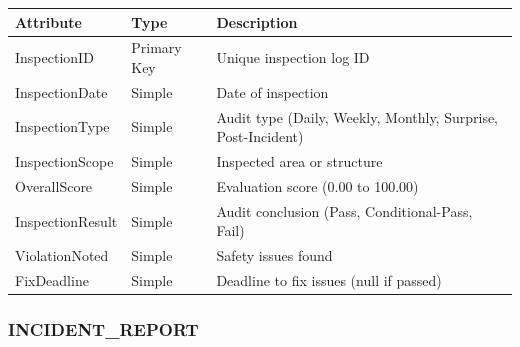 \documentclass[a4paper,12pt]{report}
\newcounter{none} %
\begin{document}
{\def\LTcaptype{none} %
\begin{longtable}[]{@{}
  >{\raggedright\arraybackslash}p{}
  >{\raggedright\arraybackslash}p{}
  >{\raggedright\arraybackslash}p{}@{}}
\toprule\noalign{}
\begin{minipage}[b]{\linewidth}\raggedright
Attribute
\end{minipage} & \begin{minipage}[b]{\linewidth}\raggedright
Type
\end{minipage} & \begin{minipage}[b]{\linewidth}\raggedright
Description
\end{minipage} \\
\midrule\noalign{}
\endhead
\bottomrule\noalign{}
\endlastfoot
InspectionID & Primary Key & Unique inspection log ID \\
InspectionDate & Simple & Date of inspection \\
InspectionType & Simple & Audit type (\allowbreak{}Daily, Weekly, Monthly, Surprise, Post-Incident) \\
InspectionScope & Simple & Inspected area or structure \\
OverallScore & Simple & Evaluation score (\allowbreak{}0.00 to 100.00) \\
InspectionResult & Simple & Audit conclusion (\allowbreak{}Pass, Conditional-Pass, Fail) \\
ViolationNoted & Simple & Safety issues found \\
FixDeadline & Simple & Deadline to fix issues (\allowbreak{}null if passed) \\
\end{longtable}
}

\subsubsection{\texorpdfstring{INCIDENT\texorpdfstring{\_\allowbreak{}}{_}REPORT}{INCIDENTREPORT}}\label{incident_report}
\end{document}
